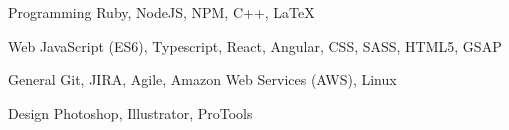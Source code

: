 

\begin{cvskills}

  \cvskill
    {Programming} %
    {Ruby, NodeJS, NPM, C++, LaTeX} %

  \cvskill
    {Web} %
    {JavaScript (ES6), Typescript, React, Angular, CSS, SASS, HTML5, GSAP} %

  \cvskill
    {General} %
    {Git, JIRA, Agile, Amazon Web Services (AWS), Linux} %

  \cvskill
    {Design} %
    {Photoshop, Illustrator, ProTools} %

\end{cvskills}
